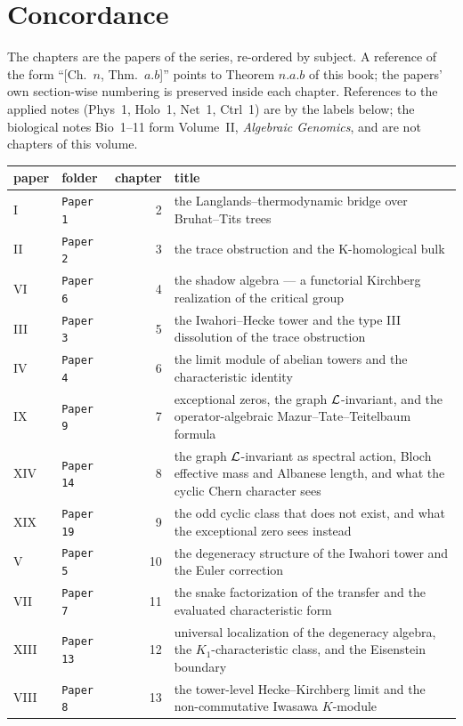 \chapter*{Concordance}
The chapters are the papers of the series, re-ordered by subject. A reference of the form ``[Ch.~$n$, Thm.~$a.b$]'' points to Theorem $n.a.b$ of this book; the papers' own section-wise numbering is preserved inside each chapter. References to the applied notes (Phys~1, Holo~1, Net~1, Ctrl~1) are by the labels below; the biological notes Bio~1--11 form Volume~II, \emph{Algebraic Genomics}, and are not chapters of this volume.

\begin{longtable}{llr>{\raggedright\arraybackslash}p{8.2cm}}
\toprule
paper & folder & chapter & title\\
\midrule
\endhead
I & \texttt{Paper 1} & 2 & the Langlands--thermodynamic bridge over Bruhat--Tits trees\\
II & \texttt{Paper 2} & 3 & the trace obstruction and the K-homological bulk\\
VI & \texttt{Paper 6} & 4 & the shadow algebra --- a functorial Kirchberg realization of the critical group\\
III & \texttt{Paper 3} & 5 & the Iwahori--Hecke tower and the type III dissolution of the trace obstruction\\
IV & \texttt{Paper 4} & 6 & the limit module of abelian towers and the characteristic identity\\
IX & \texttt{Paper 9} & 7 & exceptional zeros, the graph $\mathcal{L}$-invariant, and the operator-algebraic
Mazur--Tate--Teitelbaum formula\\
XIV & \texttt{Paper 14} & 8 & the graph $\mathcal{L}$-invariant as spectral action, Bloch effective mass and Albanese length, and what the cyclic Chern character sees\\
XIX & \texttt{Paper 19} & 9 & the odd cyclic class that does not exist, and what the exceptional zero sees instead\\
V & \texttt{Paper 5} & 10 & the degeneracy structure of the Iwahori tower and the Euler correction\\
VII & \texttt{Paper 7} & 11 & the snake factorization of the transfer and the evaluated characteristic form\\
XIII & \texttt{Paper 13} & 12 & universal localization of the degeneracy algebra, the $K_1$-characteristic class, and the
Eisenstein boundary\\
VIII & \texttt{Paper 8} & 13 & the tower-level Hecke--Kirchberg limit and the non-commutative Iwasawa $K$-module\\

\end{longtable}
